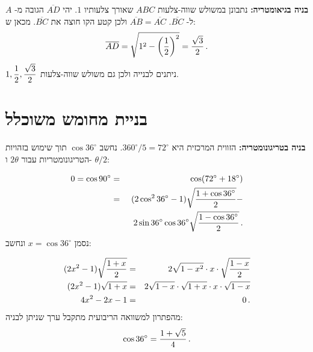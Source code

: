\textbf{בניה בגיאומטריה:}
נתבונן במשולש שווה-צלעות
$ABC$
שאורך צלעותיו 
$1$.
יהי
$\overline{AD}$
הגובה מ-%
$A$
ל-%
$\overline{BC}$.
$\overline{AB}=\overline{AC}$
ולכן קטע הקו חוצה את
$\overline{BC}$.
מכאן ש:
\[
\overline{AD}= \sqrt{1^2-\left(\displaystyle\frac{1}{2}\right)^2}=\displaystyle\frac{\sqrt{3}}{2}\,.
\]
$1,\displaystyle\frac{1}{2},\displaystyle\frac{\sqrt{3}}{2}$
ניתנים לבנייה ולכן גם משולש שווה-צלעות.
\begin{center}

\end{center}




\section{בניית מחומש משוכלל}\label{a.pentagon}

\textbf{בניה בטריגונומטריה:}
הזווית המרכזית היא
$360^\circ/5=72^\circ$.
נחשב
$\cos 36^\circ$
תוך שימוש בזהויות הטריגונומטריות עבור
$2\theta$
ו-%
$\theta/2$:

\begin{eqnarray*}
0=\cos 90^\circ &=& \cos(72^\circ+18^\circ)\\
&=&(2\cos^2 36^\circ-1)\sqrt{\displaystyle\frac{1+\cos 36^\circ}{2}}-\\
&&\hspace{6pt}2\sin 36^\circ\cos 36^\circ\sqrt{\displaystyle\frac{1-\cos 36^\circ}{2}}\,.
\end{eqnarray*}
נסמן
$x=\cos 36^\circ$ 
ונחשב:

\begin{eqnarray*}
(2x^2-1)\sqrt{\displaystyle\frac{1+x}{2}}&=&2\sqrt{1-x^2}\cdot x \cdot \sqrt{\displaystyle\frac{1-x}{2}}\\
(2x^2-1)\sqrt{1+x}&=&2\sqrt{1-x}\cdot\sqrt{1+x}\cdot x \cdot \sqrt{1-x}\\
4x^2-2x-1&=&0\,.
\end{eqnarray*}
מהפתרון למשוואה הריבועית מתקבל ערך שניתן לבניה:
\[
\cos 36^\circ = \displaystyle\frac{1+\sqrt{5}}{4}\,.
\]




